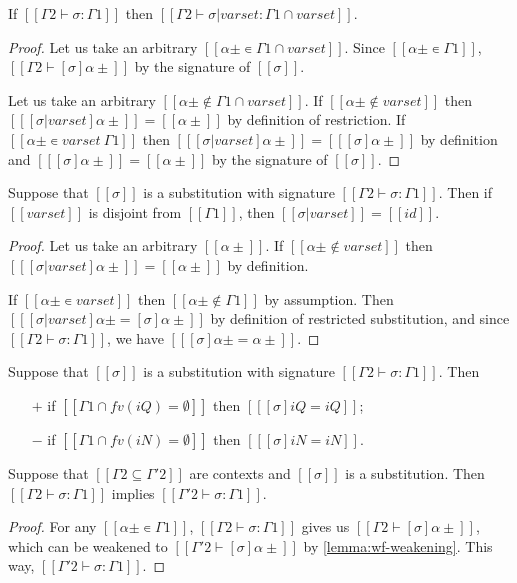 \begin{lemma}
  \label{lemma:subst-restr-sig}
  If $[[Γ2 ⊢ σ : Γ1]]$ then $[[Γ2 ⊢ σ|varset :  Γ1 ∩ varset]]$.
\end{lemma}
\begin{proof}
  Let us take an arbitrary $[[α± ∊ Γ1 ∩ varset]]$.
  Since $[[α± ∊ Γ1]]$, $[[Γ2 ⊢ [σ]α± ]]$ by the signature of $[[σ]]$.

  Let us take an arbitrary $[[α± ∉ Γ1 ∩ varset]]$.
  If $[[α± ∉ varset]]$ then $[[ [σ|varset]α± ]] = [[α±]]$ by definition
  of restriction. 
  If $[[α± ∊ varset \ Γ1]]$ then $[[ [σ|varset]α± ]] = [[ [σ]α± ]]$ by definition
  and $[[ [σ]α± ]] = [[α±]]$ by the signature of $[[σ]]$.
\end{proof}

\begin{lemma}
  Suppose that $[[σ]]$ is a substitution with signature $[[Γ2 ⊢ σ : Γ1]]$. 
  Then if $[[varset]]$ is disjoint from $[[Γ1]]$, 
  then $[[ σ|varset]] = [[ id ]]$. 
\end{lemma}
\begin{proof}
  Let us take an arbitrary $[[α±]]$.
  If $[[α± ∉ varset]]$ then $[[ [σ|varset]α±]] = [[α±]]$ by definition.

  If $[[α± ∊ varset]]$ then $[[α± ∉ Γ1]]$ by assumption.
  Then $[[ [σ|varset]α± = [σ]α±]]$ by definition of restricted substitution, and
  since $[[Γ2 ⊢ σ : Γ1]]$, we have $[[ [σ]α± = α± ]]$.
\end{proof}

\begin{corollary}
  \label{corollary:subst-disj}
  Suppose that $[[σ]]$ is a substitution with signature $[[Γ2 ⊢ σ : Γ1]]$. Then
  \begin{itemize}
    \item [$+$] if $[[Γ1 ∩ fv(iQ) = ∅]]$ then $[[ [σ] iQ = iQ]]$;
    \item [$-$] if $[[Γ1 ∩ fv(iN) = ∅]]$ then $[[ [σ] iN = iN]]$.
  \end{itemize}
\end{corollary}

\begin{lemma}
  \label{lemma:subst-range-weakening}
  Suppose that $[[Γ2 ⊆ Γ'2]]$ are contexts and 
  $[[σ]]$ is a substitution.
  Then $[[Γ2 ⊢ σ : Γ1]]$ implies $[[Γ'2 ⊢ σ : Γ1]]$.
\end{lemma}
\begin{proof}
  For any $[[α± ∊ Γ1]]$, 
  $[[Γ2 ⊢ σ : Γ1]]$ gives us  $[[ Γ2 ⊢ [σ]α± ]]$, which can be
  weakened to $[[ Γ'2 ⊢ [σ]α± ]]$ by \cref{lemma:wf-weakening}. 
  This way, $[[Γ'2 ⊢ σ : Γ1]]$.
\end{proof}

